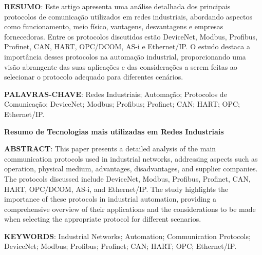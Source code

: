 \documentclass[a4paper,11pt]{article} %
\begin{document}


\begin{center}
    \tableofcontents %
\end{center}

\newpage


\vspace{0.5cm}
\noindent\textbf{RESUMO}:
Este artigo apresenta uma análise detalhada dos principais protocolos de comunicação utilizados em redes industriais, abordando aspectos como funcionamento, meio físico, vantagens, desvantagens e empresas fornecedoras. Entre os protocolos discutidos estão DeviceNet, Modbus, Profibus, Profinet, CAN, HART, OPC/DCOM, AS-i e Ethernet/IP. O estudo destaca a importância desses protocolos na automação industrial, proporcionando uma visão abrangente das suas aplicações e das considerações a serem feitas ao selecionar o protocolo adequado para diferentes cenários.

\vspace{0.5cm}
\noindent\textbf{PALAVRAS-CHAVE}:
Redes Industriais; Automação; Protocolos de Comunicação; DeviceNet; Modbus; Profibus; Profinet; CAN; HART; OPC; Ethernet/IP.

\vspace{0.5cm}
\begin{center}
    \textbf{Resumo de Tecnologias mais utilizadas em Redes Industriais}
\end{center}

\noindent\textbf{ABSTRACT}:
This paper presents a detailed analysis of the main communication protocols used in industrial networks, addressing aspects such as operation, physical medium, advantages, disadvantages, and supplier companies. The protocols discussed include DeviceNet, Modbus, Profibus, Profinet, CAN, HART, OPC/DCOM, AS-i, and Ethernet/IP. The study highlights the importance of these protocols in industrial automation, providing a comprehensive overview of their applications and the considerations to be made when selecting the appropriate protocol for different scenarios.

\vspace{0.5cm}
\noindent\textbf{KEYWORDS}:
Industrial Networks; Automation; Communication Protocols; DeviceNet; Modbus; Profibus; Profinet; CAN; HART; OPC; Ethernet/IP.
\end{document}
